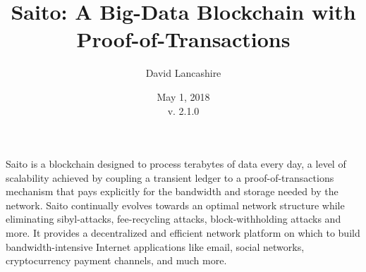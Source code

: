 \documentclass[11.5pt, oneside]{article}   	%
\title{Saito: A Big-Data Blockchain with Proof-of-Transactions}
\author{David Lancashire}
\date{May 1, 2018\\v. 2.1.0}
\begin{document}
\maketitle



\begin{onecolabstract}
Saito is a blockchain designed to process terabytes of data every day, a level of scalability achieved by coupling a transient ledger to a proof-of-transactions mechanism that pays explicitly for the bandwidth and storage needed by the network. Saito continually evolves towards an optimal network structure while eliminating sibyl-attacks, fee-recycling attacks, block-withholding attacks and more. It provides a decentralized and efficient network platform on which to build bandwidth-intensive Internet applications like email, social networks, cryptocurrency payment channels, and much more.
\end{onecolabstract}
\end{document}
